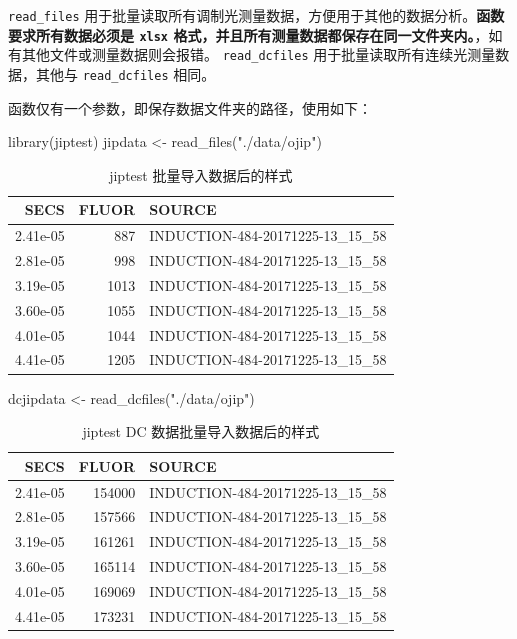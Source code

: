 \documentclass[
]{krantz}
\makeatletter
\newenvironment{Shaded}{\begin{snugshade}}{\end{snugshade}}
\newcommand{\FunctionTok}[1]{\textcolor[rgb]{0.00,0.00,0.00}{#1}}
\newcommand{\NormalTok}[1]{#1}
\newcommand{\OtherTok}[1]{\textcolor[rgb]{0.56,0.35,0.01}{#1}}
\newcommand{\StringTok}[1]{\textcolor[rgb]{0.31,0.60,0.02}{#1}}
\newenvironment{kframe}{%
\medskip{}
\setlength{\fboxsep}{.8em}
 \def\at@end@of@kframe{}%
 \ifinner\ifhmode%
  \def\at@end@of@kframe{\end{minipage}}%
  \begin{minipage}{\columnwidth}%
 \fi\fi%
 \def\FrameCommand##1{\hskip\@totalleftmargin \hskip-\fboxsep
 \colorbox{shadecolor}{##1}\hskip-\fboxsep
     \hskip-\linewidth \hskip-\@totalleftmargin \hskip\columnwidth}%
 \MakeFramed {\advance\hsize-\width
   \@totalleftmargin\z@ \linewidth\hsize
   \@setminipage}}%
 {\par\unskip\endMakeFramed%
 \at@end@of@kframe}
\renewenvironment{Shaded}{\begin{kframe}}{\end{kframe}}
\makeatother
\begin{document}
\texttt{read\_files} 用于批量读取所有调制光测量数据，方便用于其他的数据分析。\textbf{函数要求所有数据必须是 \texttt{xlsx} 格式，并且所有测量数据都保存在同一文件夹内。}，如有其他文件或测量数据则会报错。
\texttt{read\_dcfiles} 用于批量读取所有连续光测量数据，其他与 \texttt{read\_dcfiles} 相同。

函数仅有一个参数，即保存数据文件夹的路径，使用如下：

\begin{Shaded}
\begin{Highlighting}[]
\FunctionTok{library}\NormalTok{(jiptest)}
\NormalTok{jipdata }\OtherTok{\textless{}{-}} \FunctionTok{read\_files}\NormalTok{(}\StringTok{"./data/ojip"}\NormalTok{)}
\end{Highlighting}
\end{Shaded}

\begin{table}

\caption{\label{tab:unnamed-chunk-66}jiptest 批量导入数据后的样式}
\centering
\begin{tabular}[t]{rrl}
\toprule
SECS & FLUOR & SOURCE\\
\midrule
2.41e-05 & 887 & INDUCTION-484-20171225-13\_15\_58\\
2.81e-05 & 998 & INDUCTION-484-20171225-13\_15\_58\\
3.19e-05 & 1013 & INDUCTION-484-20171225-13\_15\_58\\
3.60e-05 & 1055 & INDUCTION-484-20171225-13\_15\_58\\
4.01e-05 & 1044 & INDUCTION-484-20171225-13\_15\_58\\
\addlinespace
4.41e-05 & 1205 & INDUCTION-484-20171225-13\_15\_58\\
\bottomrule
\end{tabular}
\end{table}

\begin{Shaded}
\begin{Highlighting}[]
\NormalTok{dcjipdata }\OtherTok{\textless{}{-}} \FunctionTok{read\_dcfiles}\NormalTok{(}\StringTok{"./data/ojip"}\NormalTok{)}
\end{Highlighting}
\end{Shaded}

\begin{table}

\caption{\label{tab:unnamed-chunk-67}jiptest DC 数据批量导入数据后的样式}
\centering
\begin{tabular}[t]{rrl}
\toprule
SECS & FLUOR & SOURCE\\
\midrule
2.41e-05 & 154000 & INDUCTION-484-20171225-13\_15\_58\\
2.81e-05 & 157566 & INDUCTION-484-20171225-13\_15\_58\\
3.19e-05 & 161261 & INDUCTION-484-20171225-13\_15\_58\\
3.60e-05 & 165114 & INDUCTION-484-20171225-13\_15\_58\\
4.01e-05 & 169069 & INDUCTION-484-20171225-13\_15\_58\\
\addlinespace
4.41e-05 & 173231 & INDUCTION-484-20171225-13\_15\_58\\
\bottomrule
\end{tabular}
\end{table}
\end{document}
